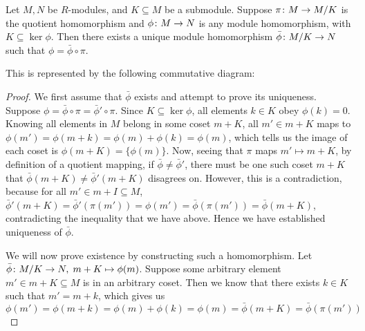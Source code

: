 \begin{theorem}\label{thm:univ-prop-quotient-mod}
    Let \(M,N\) be \(R\)-modules, and \(K \subseteq M\) be a submodule.
    Suppose \(\pi\colon M\to M/K\) is the quotient homomorphism
    and \(\phi\colon M\to N\) is any module homomorphism, with \(K \subseteq \ker\phi\).
    Then there exists a unique module homomorphism \(\bar{\phi}\colon M/K\to N\)
    such that \(\phi = \bar{\phi}\circ\pi\).

    This is represented by the following commutative diagram:
    \begin{center}
    \end{center}
\end{theorem}
\begin{proof}
    We first assume that \(\bar{\phi}\) exists and attempt to prove its uniqueness.
    Suppose \(\phi = \bar{\phi}\circ\pi = \bar{\phi}'\circ\pi\).
    Since \(K \subseteq \ker\phi\),
    all elements \(k \in K\) obey \(\phi(k) = 0\).
    Knowing all elements in \(M\) belong in some coset \(m+K\),
    all \(m' \in m+K\) maps to \(\phi(m') = \phi(m+k) = \phi(m) + \phi(k) = \phi(m)\),
    which tells us the image of each coset is \(\phi(m+K) = \{\phi(m)\}\).
    Now, seeing that \(\pi\) maps \(m' \mapsto m+K\),
    by definition of a quotient mapping,
    if \(\bar{\phi}\neq\bar{\phi}'\),
    there must be one such coset \(m+K\) that
    \(\bar{\phi}(m+K) \neq \bar{\phi}'(m+K)\) disagrees on.
    However, this is a contradiction,
    because for all \(m' \in m+I \subseteq M\),
    \(\bar{\phi}'(m+K) = \bar{\phi}'(\pi(m')) = \phi(m') = \bar{\phi}(\pi(m')) = \bar{\phi}(m+K)\),
    contradicting the inequality that we have above.
    Hence we have established uniqueness of \(\bar{\phi}\).

    We will now prove existence by constructing such a homomorphism.
    Let \(\bar{\phi}\colon M/K\to N,\;m+K\mapsto\phi(m)\).
    Suppose some arbitrary element \(m' \in m+K \subseteq M\) is in an arbitrary coset.
    Then we know that there exists \(k \in K\) such that \(m' = m+k\),
    which gives us
    \begin{equation*}
        \phi(m') = \phi(m+k) = \phi(m)+\phi(k) = \phi(m)
        = \bar{\phi}(m+K) = \bar{\phi}(\pi(m'))
    \end{equation*}
\end{proof}

